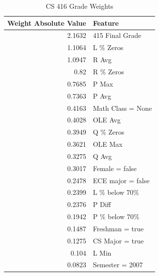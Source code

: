 \documentclass[letterpaper,11pt]{article}
\begin{document}
\begin{table}[h!]
\begin{center}
  \begin{tabular}{ r | l }
Weight Absolute Value & Feature   \\ \hline
2.1632 & 415 Final Grade \\
1.1064 & L \% Zeros  \\
1.0947 & R Avg  \\
0.82 & R \% Zeros  \\
0.7685 & P Max  \\
0.7363 & P Avg  \\
0.4163 & Math Class = None \\
0.4028 & OLE Avg  \\
0.3949 & Q \% Zeros  \\
0.3621 & OLE Max  \\
0.3275 & Q Avg  \\
0.3017 & Female = false \\
0.2478 & ECE major = false \\
0.2399 & L \% below 70\%  \\
0.2376 & P Diff  \\
0.1942 & P \% below 70\%  \\
0.1487 & Freshman = true \\
0.1275 & CS Major = true \\
0.104 & L Min  \\
0.0823 & Semester = 2007 \\
  \end{tabular}
\end{center}
  \caption {CS 416 Grade Weights}
\label{table:416weights}
\end{table}
\end{document}
